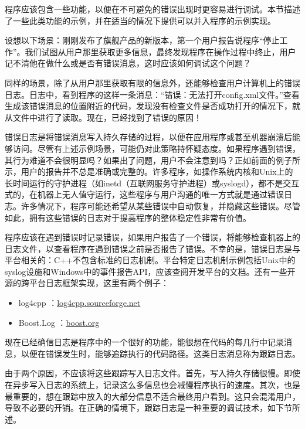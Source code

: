 
程序应该包含一些功能，以便在不可避免的错误出现时更容易进行调试。本节描述了一些此类功能的示例，并在适当的情况下提供可以并入程序的示例实现。


设想以下场景：刚刚发布了旗舰产品的新版本，第一个用户报告说程序“停止工作”。我们试图从用户那里获取更多信息，最终发现程序在操作过程中终止，用户记不清他在做什么或是否有错误消息，这时应该如何调试这个问题？

同样的场景，除了从用户那里获取有限的信息外，还能够检查用户计算机上的错误日志。日志中，看到程序的这样一条消息：“错误：无法打开config.xml文件。”查看生成该错误消息的位置附近的代码，发现没有检查文件是否成功打开的情况下，就从文件中进行了读取。现在，已经找到了错误的原因！

错误日志是将错误消息写入持久存储的过程，以便在应用程序或甚至机器崩溃后能够访问。尽管有上述示例场景，可能仍对此策略持怀疑态度。如果程序遇到错误，其行为难道不会很明显吗？如果出了问题，用户不会注意到吗？正如前面的例子所示，用户的报告并不总是准确或完整的。许多程序，如操作系统内核和Unix上的长时间运行的守护进程（如inetd（互联网服务守护进程）或syslogd），都不是交互式的，在机器上无人值守运行，这些程序与用户沟通的唯一方式就是通过错误日志。许多情况下，程序可能还希望从某些错误中自动恢复，并隐藏这些错误。尽管如此，拥有这些错误的日志对于提高程序的整体稳定性非常有价值。

程序应该在遇到错误时记录错误，如果用户报告了一个错误，将能够检查机器上的日志文件，以查看程序在遇到错误之前是否报告了错误。不幸的是，错误日志是与平台相关的：C++不包含标准的日志机制。平台特定日志机制示例包括Unix中的syslog设施和Windows中的事件报告API，应该查阅开发平台的文档。还有一些开源的跨平台日志框架实现，这里有两个例子：

\begin{itemize}
\item
log4cpp ：\url{log4cpp.sourceforge.net}

\item
Boost.Log ：\url{boost.org}
\end{itemize}

现在已经确信日志是程序中的一个很好的功能，能很想在代码的每几行中记录消息，以便在错误发生时，能够追踪执行的代码路径。这类日志消息称为跟踪日志。

由于两个原因，不应该将这些跟踪写入日志文件。首先，写入持久存储很慢。即使在异步写入日志的系统上，记录这么多信息也会减慢程序执行的速度。其次，也是最重要的，想在跟踪中放入的大部分信息不适合最终用户看到。这只会混淆用户，导致不必要的开销。在正确的情境下，跟踪日志是一种重要的调试技术，如下节所述。

